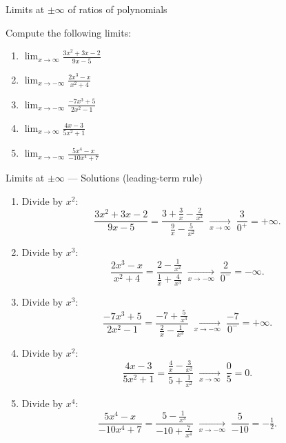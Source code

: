 \documentclass[9pt]{beamer}
\begin{document}
\begin{frame}{Limits at $\pm\infty$ of ratios of polynomials}

Compute the following limits:

\begin{enumerate}[leftmargin=0.5cm, label=(\alph*), rightmargin=0.2cm]
\item $\displaystyle \lim_{x\to\infty}\frac{3x^2+3x-2}{9x-5}$
\item $\displaystyle \lim_{x\to-\infty}\frac{2x^3-x}{x^2+4}$
\item $\displaystyle \lim_{x\to-\infty}\frac{-7x^3+5}{2x^2-1}$
\item $\displaystyle \lim_{x\to\infty}\frac{4x-3}{5x^2+1}$
\item $\displaystyle \lim_{x\to-\infty}\frac{5x^4-x}{-10x^4+7}$
\end{enumerate}

\end{frame}

\begin{frame}{Limits at $\pm\infty$ — Solutions (leading-term rule)}

\small

\begin{enumerate}[leftmargin=0.5cm, label=(\alph*), rightmargin=0.2cm]

\item Divide by $x^2$:
\[
\frac{3x^2+3x-2}{9x-5}
=\frac{3+\frac{3}{x}-\frac{2}{x^2}}{\frac{9}{x}-\frac{5}{x^2}}
\;\xrightarrow[x\to\infty]{}\; \frac{3}{0^+}= \boxed{+\infty}.
\]

\item Divide by $x^3$:
\[
\frac{2x^3-x}{x^2+4}
=\frac{2-\frac{1}{x^2}}{\frac{1}{x}+\frac{4}{x^3}}
\;\xrightarrow[x\to-\infty]{}\; \frac{2}{0^-}= \boxed{-\infty}.
\]

\item Divide by $x^3$:
\[
\frac{-7x^3+5}{2x^2-1}
=\frac{-7+\frac{5}{x^3}}{\frac{2}{x}-\frac{1}{x^3}}
\;\xrightarrow[x\to-\infty]{}\; \frac{-7}{0^-}= \boxed{+\infty}.
\]

\item Divide by $x^2$:
\[
\frac{4x-3}{5x^2+1}
=\frac{\frac{4}{x}-\frac{3}{x^2}}{5+\frac{1}{x^2}}
\;\xrightarrow[x\to\infty]{}\; \frac{0}{5}= \boxed{0}.
\]

\item Divide by $x^4$:
\[
\frac{5x^4-x}{-10x^4+7}
=\frac{5-\frac{1}{x^3}}{-10+\frac{7}{x^4}}
\;\xrightarrow[x\to-\infty]{}\; \frac{5}{-10}= \boxed{-\tfrac12}.
\]

\end{enumerate}

\end{frame}
\end{document}
